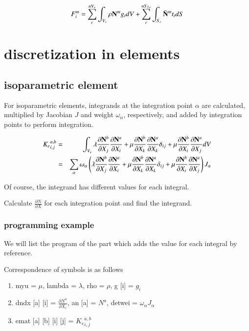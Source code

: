 \begin{equation}
F^m_i = \sum_e^{nV_e}\int_{V_e}\rho \mathbf{N}^m g_idV + \sum_e^{n{S_2}_e}\int_{S_e} \bar{\mathbf{N}}^m t_idS
\end{equation}

\section{discretization in elements}

\subsection{isoparametric element}


For isoparametric elements, integrands at the integration point $\alpha$ are calculated, multiplied by Jacobian $J$ and weight $\omega_{\alpha}$, respectively, and added by integration points to perform integration.

\begin{eqnarray}
{K_e}^{a,b}_{i,j}
&=& \int_{V_e} \lambda\frac{\partial \mathbf{N}^b }{\partial X_j}\frac{\partial \mathbf{N}^a }{\partial X_i} + \mu\frac{\partial \mathbf{N}^b}{\partial X_k}\frac{\partial \mathbf{N}^a}{\partial X_k}\delta_{ij} + \mu\frac{\partial \mathbf{N}^b}{\partial X_i}\frac{\partial \mathbf{N}^a}{\partial X_j} dV\\
&=& \sum_{\alpha}\omega_{\alpha}\left(\lambda\frac{\partial \mathbf{N}^b }{\partial X_j}\frac{\partial \mathbf{N}^a }{\partial X_i} + \mu\frac{\partial \mathbf{N}^b}{\partial X_k}\frac{\partial \mathbf{N}^a}{\partial X_k}\delta_{ij} + \mu\frac{\partial \mathbf{N}^b}{\partial X_i}\frac{\partial \mathbf{N}^a}{\partial X_j}\right)J_{\alpha}
\end{eqnarray}


Of course, the integrand has different values ​​for each integral.

Calculate $\frac{\partial N}{\partial X}$ for each integration point and find the integrand.

\subsubsection{programming example}


We will list the program of the part which adds the value for each integral by reference.

Correspondence of symbols is as follows

\begin{enumerate}
\item myu = $\mu$, lambda = $\lambda$, rho = $\rho$, g [i] = $g_i$
\item dndx [a] [i] = $\frac{\partial N^a}{\partial X_i}$, an [a] = $N^a$, detwei = $\omega_{\alpha}J_{\alpha}$
\item emat [a] [b] [i] [j] = ${K_e}^{a,b}_{i,j}$
\end{enumerate}


